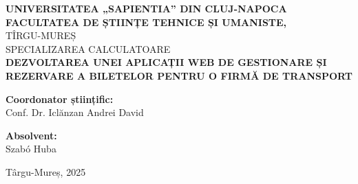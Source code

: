 \begin{titlepage}
    \centering
    \vspace*{2cm}

    {\Large \textbf{UNIVERSITATEA „SAPIENTIA” DIN CLUJ-NAPOCA}}\\[0.2cm]
    {\Large \textbf{FACULTATEA DE ȘTIINȚE TEHNICE ȘI UMANISTE,}}\\[0.5cm]
    {\large TÎRGU-MUREȘ}\\[0.2cm]
    {\large  SPECIALIZAREA CALCULATOARE}\\[3cm]

    {\LARGE \textbf{DEZVOLTAREA UNEI APLICAȚII WEB DE GESTIONARE ȘI REZERVARE A BILETELOR PENTRU O FIRMĂ DE TRANSPORT}}\\[0.5cm] 
    

    \noindent
\begin{minipage}[t]{0.48\textwidth}
    \raggedright
    \textbf{Coordonator științific:}\\[1em]
    Conf. Dr. Iclănzan Andrei David
\end{minipage}
\hfill
\begin{minipage}[t]{0.48\textwidth}
    \raggedleft
    \textbf{Absolvent:}\\[1em]
    Szabó Huba
\end{minipage}


    \vfill

    {\large  Târgu-Mureș, 2025}

\end{titlepage}
